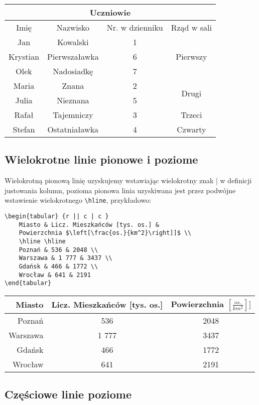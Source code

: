 \documentclass[10pt,a4paper]{article}
\begin{document}
\begin{tabular}{c | c | c | c}
	\hline
	\multicolumn{4}{c}{Uczniowie} \\ \hline
	Imię & Nazwisko & Nr. w dzienniku & Rząd w sali \\ \hline
	Jan & Kowalski & 1 & \multirow{3}{*}{Pierwszy}\\
	Krystian & Pierwszaławka & 6 & \\
	Olek & Nadosiadkę & 7 & \\ \hline
	Maria & Znana & 2 & \multirow{2}{*}{Drugi}\\
	Julia & Nieznana & 5 & \\ \hline
	Rafał & Tajemniczy & 3 & Trzeci\\ \hline
	Stefan & Ostatniaławka & 4 & Czwarty
\end{tabular}

\subsection{Wielokrotne linie pionowe i poziome}

Wielokrotną pionową linię uzyskujemy wstawiając wielokrotny znak \lstinline||| w definicji justowania kolumn, pozioma pionowa linia uzyskiwana jest przez podwójne wstawienie wielokrotnego \lstinline|\hline|, przykładowo:

\begin{lstlisting}
\begin{tabular} {r || c | c }
	Miasto & Licz. Mieszkańców [tys. os.] & 
	Powierzchnia $\left[\frac{os.}{km^2}\right]]$ \\ 
	\hline \hline
	Poznań & 536 & 2048 \\
	Warszawa & 1 777 & 3437 \\
	Gdańsk & 466 & 1772 \\
	Wrocław & 641 & 2191
\end{tabular}
\end{lstlisting}

\begin{tabular} {r || c | c }
	Miasto & Licz. Mieszkańców [tys. os.] & 
	Powierzchnia $\left[\frac{os.}{km^2}\right]]$ \\ \hline \hline
	Poznań & 536 & 2048 \\
	Warszawa & 1 777 & 3437 \\
	Gdańsk & 466 & 1772 \\
	Wrocław & 641 & 2191
\end{tabular}

\subsection{Częściowe linie poziome}
\end{document}
